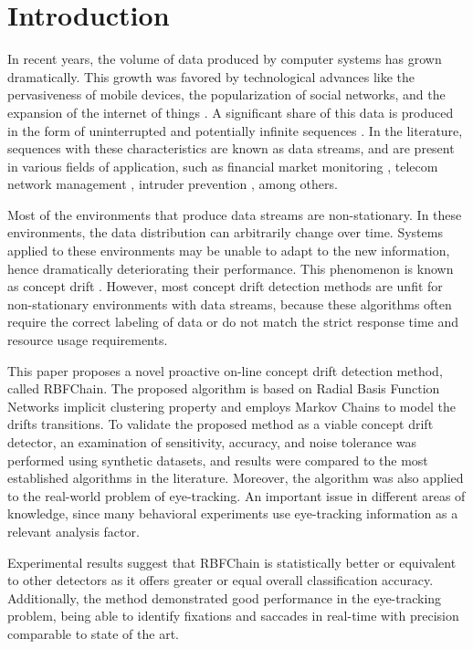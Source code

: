\documentclass[preprint,12pt]{elsarticle}
\begin{document}
\section{Introduction}
\label{sec:intro}
In recent years,
the volume of data produced by computer systems has grown dramatically.
This growth was favored by technological advances like
the pervasiveness of mobile devices,
the popularization of social networks, and
the expansion of the internet of things \cite{Cohen:BigData:2009:MSN:1687553.1687576}.
%
A significant share of this data is produced in the form of uninterrupted and potentially infinite sequences \cite{Aggarwal:2006:DSM:1196418}.
In the literature,
sequences with these characteristics are known as data streams,
and are present in various fields of application,
such as financial market monitoring  \cite{ZHOU:2015},
telecom network management \cite{delattre2015method},
 intruder prevention \cite{KENKRE:PAI:COLACO:2015},
 among others.

Most of the environments that produce data streams are non-stationary.
In these environments, the data distribution can arbitrarily change over time.
Systems applied to these environments may be unable to adapt to the new information, hence dramatically deteriorating their performance.
This phenomenon is known as concept drift \cite{Gama:2014:DAF:2670967.2670971}.
%
However, most concept drift detection methods are unfit for non-stationary environments with data streams,
because these algorithms often require the correct labeling of data or do not match the strict response time and resource usage requirements.

This paper proposes a novel proactive on-line concept drift detection method, called RBFChain.
The proposed algorithm is based on Radial Basis Function Networks implicit clustering property
and employs Markov Chains to model the drifts transitions.
To validate the proposed method as a viable concept drift detector,
an examination of sensitivity, accuracy,
and noise tolerance was performed using synthetic datasets,
and results were compared to the most established algorithms in the literature.
%
Moreover, the algorithm was also applied to the real-world problem of eye-tracking.
An important issue in different areas of knowledge, since many behavioral experiments use eye-tracking information as a relevant analysis factor.

Experimental results suggest that RBFChain is statistically better or equivalent to other detectors as it offers greater or equal overall classification accuracy.
Additionally, the method demonstrated good performance in the eye-tracking problem,
being able to identify fixations and saccades in real-time with precision comparable to state of the art.
\end{document}

